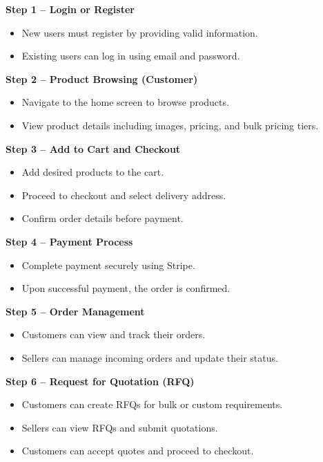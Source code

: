 \textbf{Step 1 – Login or Register}
\begin{itemize}
    \item New users must register by providing valid information.
    \item Existing users can log in using email and password.
\end{itemize}

\textbf{Step 2 – Product Browsing (Customer)}

\begin{itemize}
    \item Navigate to the home screen to browse products.
    \item View product details including images, pricing, and bulk pricing tiers.
\end{itemize}

\textbf{Step 3 – Add to Cart and Checkout}

\begin{itemize}
    \item Add desired products to the cart.
    \item Proceed to checkout and select delivery address.
    \item Confirm order details before payment.
\end{itemize}

\textbf{Step 4 – Payment Process}

\begin{itemize}
    \item Complete payment securely using Stripe.
    \item Upon successful payment, the order is confirmed.
\end{itemize}

\textbf{Step 5 – Order Management}

\begin{itemize}
    \item Customers can view and track their orders.
    \item Sellers can manage incoming orders and update their status.
\end{itemize}

\textbf{Step 6 – Request for Quotation (RFQ)}

\begin{itemize}
    \item Customers can create RFQs for bulk or custom requirements.
    \item Sellers can view RFQs and submit quotations.
    \item Customers can accept quotes and proceed to checkout.
\end{itemize}

